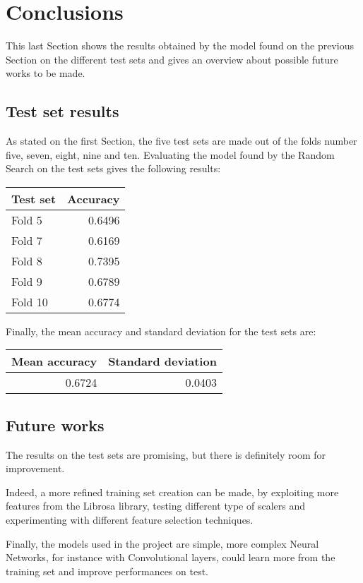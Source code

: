 \section{Conclusions}
\label{results}

This last Section shows the results obtained by the model found 
on the previous Section on the different test sets and
gives an overview about possible future works to be made.

\subsection{Test set results}
As stated on the first Section, the five test sets are made out of the 
folds number five, seven, eight, nine and ten.
Evaluating the model found by the Random Search on the test sets 
gives the following results: 

\begin{center}
    \begin{tabular}{ |l|r| } 
        \hline
        Test set & Accuracy\\
        \hline
        Fold 5 & 0.6496 \\
        Fold 7 & 0.6169 \\
        Fold 8 & 0.7395 \\
        Fold 9 & 0.6789 \\
        Fold 10 & 0.6774 \\ 
        \hline
    \end{tabular}
\end{center}

Finally, the mean accuracy and standard deviation for the test sets are: 
\begin{center}
    \begin{tabular}{ |r|r| } 
        \hline
        Mean accuracy & Standard deviation\\
        \hline
        0.6724 & 0.0403 \\
        \hline
    \end{tabular}
\end{center}

\subsection{Future works}

The results on the test sets are promising, but there is definitely 
room for improvement.

Indeed, a more refined training set creation can be made, by exploiting 
more features from the Librosa library, testing different type 
of scalers and experimenting with different feature selection 
techniques.

Finally, the models used in the project are simple, more complex 
Neural Networks, for instance with Convolutional layers, could learn 
more from the training set and improve performances on test.